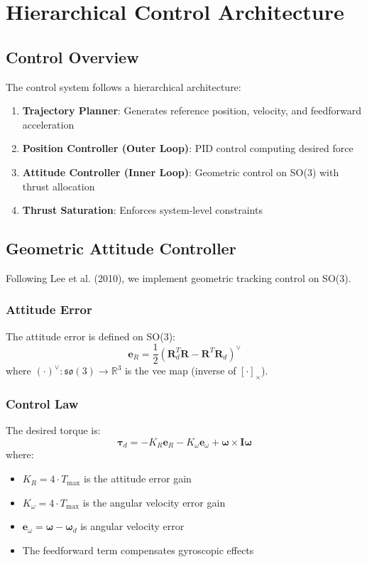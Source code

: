 \documentclass[12pt,a4paper]{article}
\begin{document}
\section{Hierarchical Control Architecture}
\label{sec:control}

\subsection{Control Overview}

The control system follows a hierarchical architecture:
\begin{enumerate}
    \item \textbf{Trajectory Planner}: Generates reference position, velocity, and feedforward acceleration
    \item \textbf{Position Controller (Outer Loop)}: PID control computing desired force
    \item \textbf{Attitude Controller (Inner Loop)}: Geometric control on SO(3) with thrust allocation
    \item \textbf{Thrust Saturation}: Enforces system-level constraints
\end{enumerate}

\subsection{Geometric Attitude Controller}

Following Lee et al. (2010), we implement geometric tracking control on SO(3).

\subsubsection{Attitude Error}
The attitude error is defined on SO(3):
\begin{equation}
    \mathbf{e}_R = \frac{1}{2}(\mathbf{R}_d^T\mathbf{R} - \mathbf{R}^T\mathbf{R}_d)^\vee
    \label{eq:attitude_error}
\end{equation}
where $(\cdot)^\vee : \mathfrak{so}(3) \to \mathbb{R}^3$ is the vee map (inverse of $[\cdot]_\times$).

\subsubsection{Control Law}
The desired torque is:
\begin{equation}
    \boldsymbol{\tau}_d = -K_R\mathbf{e}_R - K_\omega\mathbf{e}_\omega + \boldsymbol{\omega} \times \mathbf{I}\boldsymbol{\omega}
    \label{eq:attitude_control}
\end{equation}
where:
\begin{itemize}
    \item $K_R = 4 \cdot T_{\max}$ is the attitude error gain
    \item $K_\omega = 4 \cdot T_{\max}$ is the angular velocity error gain
    \item $\mathbf{e}_\omega = \boldsymbol{\omega} - \boldsymbol{\omega}_d$ is angular velocity error
    \item The feedforward term compensates gyroscopic effects
\end{itemize}
\end{document}
